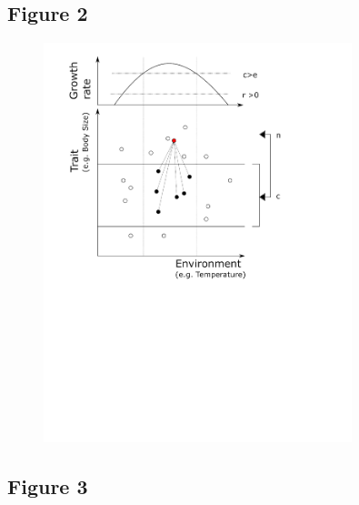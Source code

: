 \documentclass[12pt]{article}
\begin{document}
\newpage

\subsection*{Figure 2}

\begin{figure}[ht!]
\centering\includegraphics[width=0.8\textwidth]{niche}
\end{figure}

\newpage

\subsection*{Figure 3}
\end{document}
